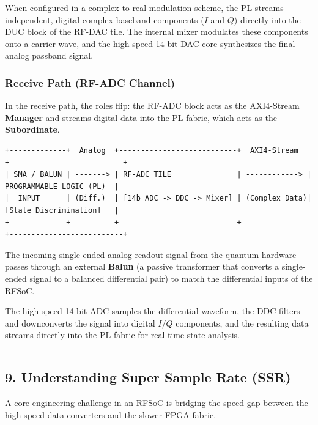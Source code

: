 \documentclass[
]{article}
\begin{document}
When configured in a complex-to-real modulation scheme, the PL streams
independent, digital complex baseband components (\(I\) and \(Q\))
directly into the DUC block of the RF-DAC tile. The internal mixer
modulates these components onto a carrier wave, and the high-speed
14-bit DAC core synthesizes the final analog passband signal.

\subsubsection{Receive Path (RF-ADC
Channel)}\label{receive-path-rf-adc-channel}

In the receive path, the roles flip: the RF-ADC block acts as the
AXI4-Stream \textbf{Manager} and streams digital data into the PL
fabric, which acts as the \textbf{Subordinate}.

\begin{verbatim}
+-------------+  Analog  +---------------------------+  AXI4-Stream  +--------------------------+
| SMA / BALUN | -------> | RF-ADC TILE               | ------------> | PROGRAMMABLE LOGIC (PL)  |
|  INPUT      | (Diff.)  | [14b ADC -> DDC -> Mixer] | (Complex Data)| [State Discrimination]   |
+-------------+          +---------------------------+               +--------------------------+
\end{verbatim}

The incoming single-ended analog readout signal from the quantum
hardware passes through an external \textbf{Balun} (a passive
transformer that converts a single-ended signal to a balanced
differential pair) to match the differential inputs of the RFSoC.

The high-speed 14-bit ADC samples the differential waveform, the DDC
filters and downconverts the signal into digital \(I/Q\) components, and
the resulting data streams directly into the PL fabric for real-time
state analysis.

\begin{center}\rule{0.5\linewidth}{0.5pt}\end{center}

\subsection{9. Understanding Super Sample Rate
(SSR)}\label{understanding-super-sample-rate-ssr}

A core engineering challenge in an RFSoC is bridging the speed gap
between the high-speed data converters and the slower FPGA fabric.
\end{document}
